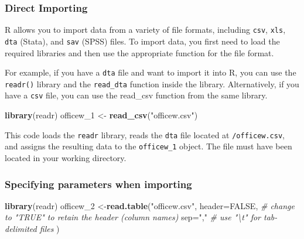 \documentclass[
]{article}
\newenvironment{Shaded}{\begin{snugshade}}{\end{snugshade}}
\newcommand{\AttributeTok}[1]{\textcolor[rgb]{0.13,0.29,0.53}{#1}}
\newcommand{\CommentTok}[1]{\textcolor[rgb]{0.56,0.35,0.01}{\textit{#1}}}
\newcommand{\ConstantTok}[1]{\textcolor[rgb]{0.56,0.35,0.01}{#1}}
\newcommand{\FunctionTok}[1]{\textcolor[rgb]{0.13,0.29,0.53}{\textbf{#1}}}
\newcommand{\NormalTok}[1]{#1}
\newcommand{\OtherTok}[1]{\textcolor[rgb]{0.56,0.35,0.01}{#1}}
\newcommand{\StringTok}[1]{\textcolor[rgb]{0.31,0.60,0.02}{#1}}
\begin{document}
\hypertarget{direct-importing}{%
\subsubsection{Direct Importing}\label{direct-importing}}

R allows you to import data from a variety of file formats, including
\texttt{csv}, \texttt{xls}, \texttt{dta} (Stata), and \texttt{sav}
(SPSS) files. To import data, you first need to load the required
libraries and then use the appropriate function for the file format.

For example, if you have a \texttt{dta} file and want to import it into
R, you can use the \texttt{readr()} library and the \texttt{read\_dta}
function inside the library. Alternatively, if you have a \texttt{csv}
file, you can use the read\_csv function from the same library.

\begin{Shaded}
\begin{Highlighting}[]
\FunctionTok{library}\NormalTok{(readr)}
\NormalTok{officew\_1 }\OtherTok{\textless{}{-}} \FunctionTok{read\_csv}\NormalTok{(}\StringTok{"officew.csv"}\NormalTok{)}
\end{Highlighting}
\end{Shaded}

This code loads the \texttt{readr} library, reads the \texttt{dta} file
located at \texttt{/officew.csv}, and assigns the resulting data to the
\texttt{officew\_1} object. The file must have been located in your
working directory.

\hypertarget{specifying-parameters-when-importing}{%
\subsubsection{Specifying parameters when
importing}\label{specifying-parameters-when-importing}}

\begin{Shaded}
\begin{Highlighting}[]
\FunctionTok{library}\NormalTok{(readr)}
\NormalTok{officew\_2 }\OtherTok{\textless{}{-}}\FunctionTok{read.table}\NormalTok{(}\StringTok{"officew.csv"}\NormalTok{,}
         \AttributeTok{header=}\ConstantTok{FALSE}\NormalTok{, }\CommentTok{\# change to "TRUE" to retain the header (column names)}
          \AttributeTok{sep=}\StringTok{","}         \CommentTok{\# use "\textbackslash{}t" for tab{-}delimited files}
\NormalTok{)}
\end{Highlighting}
\end{Shaded}
\end{document}
